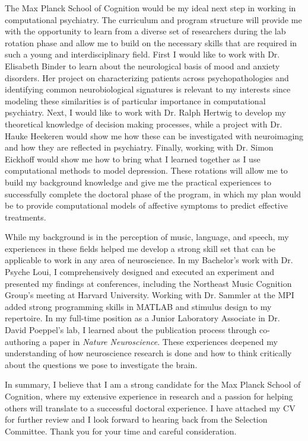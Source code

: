 \documentclass[11pt, a4paper, academicons]{awesome-cv}
\begin{document}
\begin{cvletter}
The Max Planck School of Cognition would be my ideal next step in working in computational psychiatry. The curriculum and program structure will provide me with the opportunity to learn from a diverse set of researchers during the lab rotation phase and allow me to build on the necessary skills that are required in such a young and interdisciplinary field. First I would like to work with Dr. Elisabeth Binder to learn about the neurological basis of mood and anxiety disorders. Her project on characterizing patients across psychopathologies and identifying common neurobiological signatures is relevant to my interests since modeling these similarities is of particular importance in computational psychiatry. Next, I would like to work with Dr. Ralph Hertwig to develop my theoretical knowledge of decision making processes, while a project with Dr. Hauke Heekeren would show me how these can be investigated with neuroimaging and how they are reflected in psychiatry. Finally, working with Dr. Simon Eickhoff would show me how to bring what I learned together as I use computational methods to model depression. These rotations will allow me to build my background knowledge and give me the practical experiences to successfully complete the doctoral phase of the program, in which my plan would be to provide computational models of affective symptoms to predict effective treatments. 

While my background is in the perception of music, language, and speech, my experiences in these fields helped me develop a strong skill set that can be applicable to work in any area of neuroscience. In my Bachelor’s work with Dr. Psyche Loui, I comprehensively designed and executed an experiment and presented my findings at conferences, including the Northeast Music Cognition Group’s meeting at Harvard University. Working with Dr. Sammler at the MPI added strong programming skills in MATLAB and stimulus design to my repertoire. In my full-time position as a Junior Laboratory Associate in Dr. David Poeppel’s lab, I learned about the publication process through co-authoring a paper in \textit{Nature Neuroscience}. These experiences deepened my understanding of how neuroscience research is done and how to think critically about the questions we pose to investigate the brain.

In summary, I believe that I am a strong candidate for the Max Planck School of Cognition, where my extensive experience in research and a passion for helping others will translate to a successful doctoral experience. I have attached my CV for further review and I look forward to hearing back from the Selection Committee. Thank you for your time and careful consideration. 



\end{cvletter}


\makeletterclosing
\end{document}
